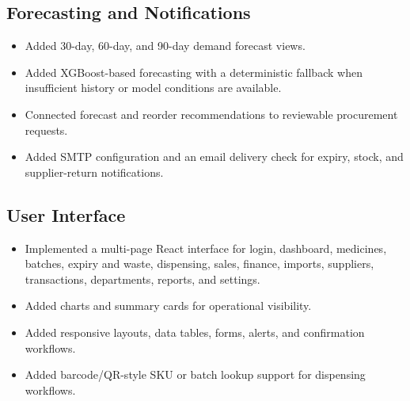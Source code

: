 \documentclass[12pt,a4paper]{article}
\begin{document}
\subsection{Forecasting and Notifications}
\begin{itemize}
    \item Added 30-day, 60-day, and 90-day demand forecast views.
    \item Added XGBoost-based forecasting with a deterministic fallback when
    insufficient history or model conditions are available.
    \item Connected forecast and reorder recommendations to reviewable
    procurement requests.
    \item Added SMTP configuration and an email delivery check for expiry,
    stock, and supplier-return notifications.
\end{itemize}

\subsection{User Interface}
\begin{itemize}
    \item Implemented a multi-page React interface for login, dashboard,
    medicines, batches, expiry and waste, dispensing, sales, finance,
    imports, suppliers, transactions, departments, reports, and settings.
    \item Added charts and summary cards for operational visibility.
    \item Added responsive layouts, data tables, forms, alerts, and
    confirmation workflows.
    \item Added barcode/QR-style SKU or batch lookup support for dispensing
    workflows.
\end{itemize}
\end{document}
